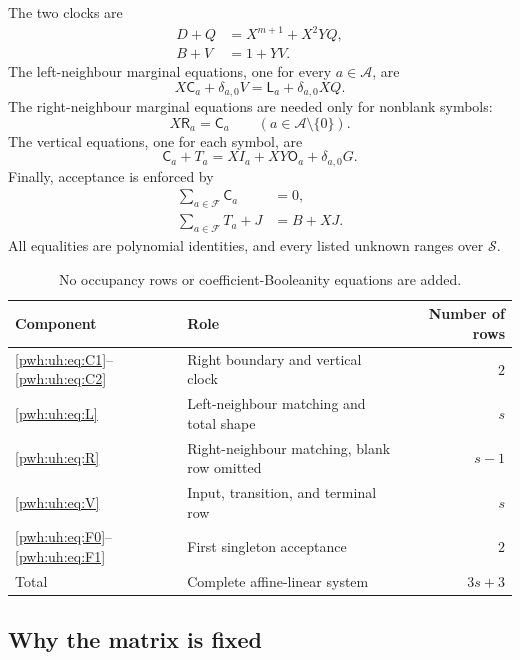 \documentclass[11pt,letterpaper]{article}
\numberwithin{equation}{section}
\theoremstyle{definition}
\newcommand{\A}{\mathcal A}
\newcommand{\F}{\mathcal F}
\newcommand{\Sring}{\mathcal S}
\newcommand{\LL}{\mathsf L}
\newcommand{\CC}{\mathsf C}
\newcommand{\RR}{\mathsf R}
\newcommand{\OO}{\mathsf O}
\newcommand{\epsa}{\delta_{a,0}}
\begin{document}
The two clocks are
\begin{align}
 D+Q&=X^{m+1}+X^2YQ, \tag{C1}\label{pwh:uh:eq:C1}\\
 B+V&=1+YV. \tag{C2}\label{pwh:uh:eq:C2}
\end{align}
The left-neighbour marginal equations, one for every $a\in\A$, are
\begin{equation}
 X\CC_a+\epsa V=\LL_a+\epsa XQ.
 \tag{L$_a$}\label{pwh:uh:eq:L}
\end{equation}
The right-neighbour marginal equations are needed only for nonblank
symbols:
\begin{equation}
 X\RR_a=\CC_a\qquad (a\in\A\setminus\{0\}).
 \tag{R$_a$}\label{pwh:uh:eq:R}
\end{equation}
The vertical equations, one for each symbol, are
\begin{equation}
 \CC_a+T_a=XI_a+XY\OO_a+\epsa G.
 \tag{V$_a$}\label{pwh:uh:eq:V}
\end{equation}
Finally, acceptance is enforced by
\begin{align}
 \sum_{a\in\F}\CC_a&=0, \tag{F0}\label{pwh:uh:eq:F0}\\
 \sum_{a\in\F}T_a+J&=B+XJ. \tag{F1}\label{pwh:uh:eq:F1}
\end{align}
All equalities are polynomial identities, and every listed unknown ranges
over $\Sring$.

\begin{table}[ht]
\centering
\begin{tabular}{@{}llr@{}}
\toprule
Component & Role & Number of rows\\
\midrule
\eqref{pwh:uh:eq:C1}--\eqref{pwh:uh:eq:C2} & Right boundary and vertical clock & $2$\\
\eqref{pwh:uh:eq:L} & Left-neighbour matching and total shape & $s$\\
\eqref{pwh:uh:eq:R} & Right-neighbour matching, blank row omitted & $s-1$\\
\eqref{pwh:uh:eq:V} & Input, transition, and terminal row & $s$\\
\eqref{pwh:uh:eq:F0}--\eqref{pwh:uh:eq:F1} & First singleton acceptance & $2$\\
\midrule
Total & Complete affine-linear system & $3s+3$\\
\bottomrule
\end{tabular}
\caption{No occupancy rows or coefficient-Booleanity equations are added.}
\label{pwh:uh:tab:rowledger}
\end{table}

\subsection{Why the matrix is fixed}
\end{document}
